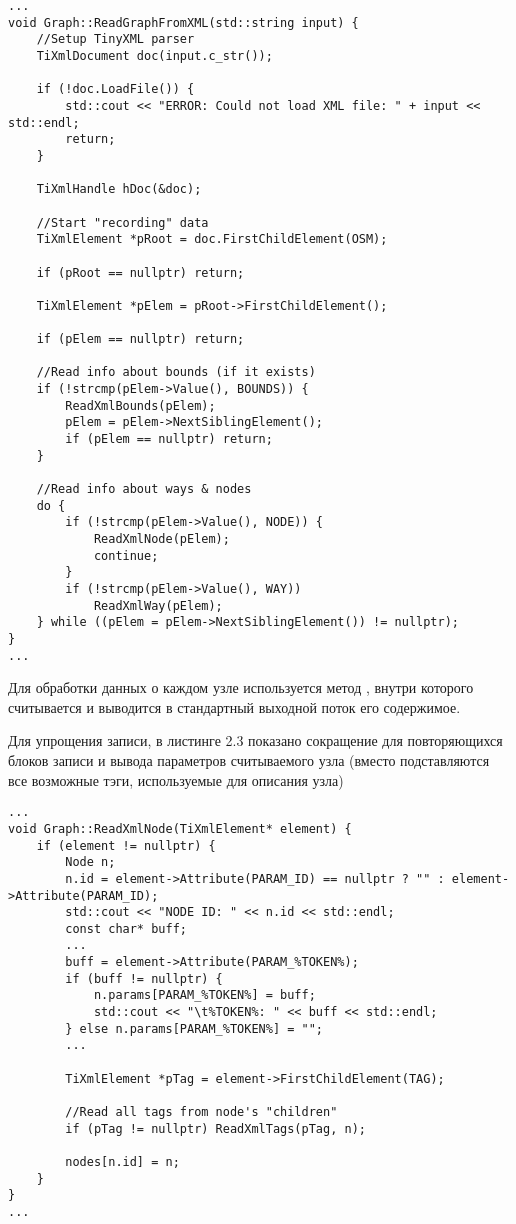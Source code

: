 \begin{lstlisting}[caption=method ReadGraphFromXML (Graph.cpp), style=customcpp]
...
void Graph::ReadGraphFromXML(std::string input) {
    //Setup TinyXML parser
    TiXmlDocument doc(input.c_str());

    if (!doc.LoadFile()) {
        std::cout << "ERROR: Could not load XML file: " + input << std::endl;
        return;
    }

    TiXmlHandle hDoc(&doc);

    //Start "recording" data
    TiXmlElement *pRoot = doc.FirstChildElement(OSM);

    if (pRoot == nullptr) return;

    TiXmlElement *pElem = pRoot->FirstChildElement();

    if (pElem == nullptr) return;

    //Read info about bounds (if it exists)
    if (!strcmp(pElem->Value(), BOUNDS)) {
        ReadXmlBounds(pElem);
        pElem = pElem->NextSiblingElement();
        if (pElem == nullptr) return;
    }

    //Read info about ways & nodes
    do {
        if (!strcmp(pElem->Value(), NODE)) {
            ReadXmlNode(pElem);
            continue;
        }
        if (!strcmp(pElem->Value(), WAY))
            ReadXmlWay(pElem);
    } while ((pElem = pElem->NextSiblingElement()) != nullptr);
}
...
\end{lstlisting}
\par Для обработки данных о каждом узле используется метод
, внутри которого считывается и выводится в стандартный
выходной поток его содержимое.
\par Для упрощения записи, в листинге 2.3 показано сокращение для повторяющихся
блоков записи и вывода параметров считываемого узла (вместо 
подставляются все возможные тэги, используемые для описания узла)
\begin{lstlisting}[caption=method ReadXmlNode (Graph.cpp), style=customcpp]
...
void Graph::ReadXmlNode(TiXmlElement* element) {
    if (element != nullptr) {
        Node n;
        n.id = element->Attribute(PARAM_ID) == nullptr ? "" : element->Attribute(PARAM_ID);
        std::cout << "NODE ID: " << n.id << std::endl;
        const char* buff;
        ...
        buff = element->Attribute(PARAM_%TOKEN%);
        if (buff != nullptr) {
            n.params[PARAM_%TOKEN%] = buff;
            std::cout << "\t%TOKEN%: " << buff << std::endl;
        } else n.params[PARAM_%TOKEN%] = "";
        ...

        TiXmlElement *pTag = element->FirstChildElement(TAG);

        //Read all tags from node's "children"
        if (pTag != nullptr) ReadXmlTags(pTag, n);

        nodes[n.id] = n;
    }
}
...
\end{lstlisting}
